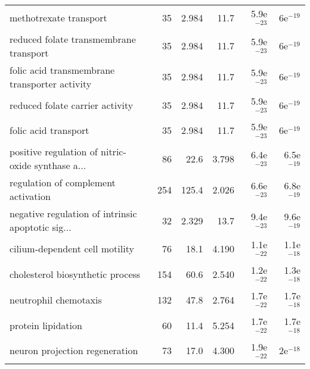 \begin{longtable}{lrrrrr}
                            methotrexate transport &                      35 &                   2.984 &       11.7 &         5.9e$^{-23}$ &           6e$^{-19}$ \\
            reduced folate transmembrane transport &                      35 &                   2.984 &       11.7 &         5.9e$^{-23}$ &           6e$^{-19}$ \\
     folic acid transmembrane transporter activity &                      35 &                   2.984 &       11.7 &         5.9e$^{-23}$ &           6e$^{-19}$ \\
                   reduced folate carrier activity &                      35 &                   2.984 &       11.7 &         5.9e$^{-23}$ &           6e$^{-19}$ \\
                              folic acid transport &                      35 &                   2.984 &       11.7 &         5.9e$^{-23}$ &           6e$^{-19}$ \\
 positive regulation of nitric-oxide synthase a... &                      86 &                    22.6 &      3.798 &         6.4e$^{-23}$ &         6.5e$^{-19}$ \\
               regulation of complement activation &                     254 &                   125.4 &      2.026 &         6.6e$^{-23}$ &         6.8e$^{-19}$ \\
 negative regulation of intrinsic apoptotic sig... &                      32 &                   2.329 &       13.7 &         9.4e$^{-23}$ &         9.6e$^{-19}$ \\
                    cilium-dependent cell motility &                      76 &                    18.1 &      4.190 &         1.1e$^{-22}$ &         1.1e$^{-18}$ \\
                  cholesterol biosynthetic process &                     154 &                    60.6 &      2.540 &         1.2e$^{-22}$ &         1.3e$^{-18}$ \\
                             neutrophil chemotaxis &                     132 &                    47.8 &      2.764 &         1.7e$^{-22}$ &         1.7e$^{-18}$ \\
                                protein lipidation &                      60 &                    11.4 &      5.254 &         1.7e$^{-22}$ &         1.7e$^{-18}$ \\
                    neuron projection regeneration &                      73 &                    17.0 &      4.300 &         1.9e$^{-22}$ &           2e$^{-18}$ \\

\end{longtable}
